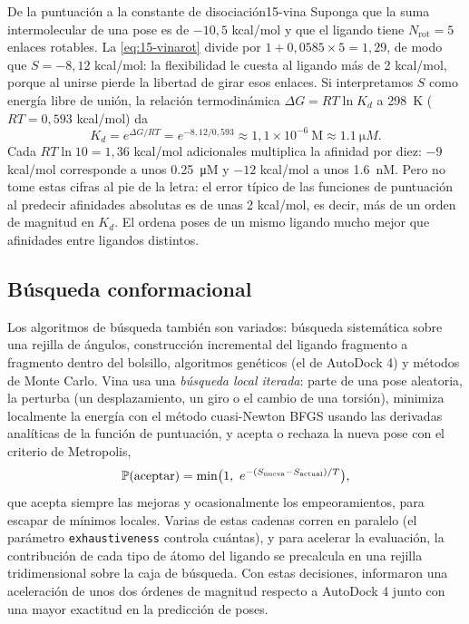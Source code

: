 \begin{ejemplo}{De la puntuación a la constante de disociación}{15-vina}
Suponga que la suma intermolecular de una pose es de $-10{,}5$ kcal/mol y que el ligando tiene $N_{\mathrm{rot}}=5$ enlaces rotables. La \cref{eq:15-vinarot} divide por $1+0{,}0585\times5=1{,}29$, de modo que $S=-8{,}12$ kcal/mol: la flexibilidad le cuesta al ligando más de 2 kcal/mol, porque al unirse pierde la libertad de girar esos enlaces. Si interpretamos $S$ como energía libre de unión, la relación termodinámica $\Delta G=RT\ln K_d$ a \SI{298}{\kelvin} ($RT=0{,}593$ kcal/mol) da
\[
K_d = e^{\Delta G/RT}=e^{-8{,}12/0{,}593}\approx1{,}1\times10^{-6}\ \mathrm{M}\approx\SI{1,1}{\micro M}.
\]
Cada $RT\ln10=1{,}36$ kcal/mol adicionales multiplica la afinidad por diez: $-9$ kcal/mol corresponde a unos \SI{0,25}{\micro M} y $-12$ kcal/mol a unos \SI{1,6}{\nano M}. Pero no tome estas cifras al pie de la letra: el error típico de las funciones de puntuación al predecir afinidades absolutas es de unas 2 kcal/mol, es decir, más de un orden de magnitud en $K_d$. El  ordena poses de un mismo ligando mucho mejor que afinidades entre ligandos distintos.
\end{ejemplo}

\subsection{Búsqueda conformacional}

Los algoritmos de búsqueda también son variados: búsqueda sistemática sobre una rejilla de ángulos, construcción incremental del ligando fragmento a fragmento dentro del bolsillo, algoritmos genéticos (el de AutoDock 4) y métodos de Monte Carlo. Vina usa una \emph{búsqueda local iterada}: parte de una pose aleatoria, la perturba (un desplazamiento, un giro o el cambio de una torsión), minimiza localmente la energía con el método cuasi-Newton BFGS usando las derivadas analíticas de la función de puntuación, y acepta o rechaza la nueva pose con el criterio de Metropolis,
\begin{equation}\label{eq:15-metropolis}
\Prob(\text{aceptar})=\min\!\big(1,\ e^{-(S_{\text{nueva}}-S_{\text{actual}})/T}\big),
\end{equation}
que acepta siempre las mejoras y ocasionalmente los empeoramientos, para escapar de mínimos locales. Varias de estas cadenas corren en paralelo (el parámetro \texttt{exhaustiveness} controla cuántas), y para acelerar la evaluación, la contribución de cada tipo de átomo del ligando se precalcula en una rejilla tridimensional sobre la caja de búsqueda. Con estas decisiones, \textcite{c15-trott2010} informaron una aceleración de unos dos órdenes de magnitud respecto a AutoDock 4 junto con una mayor exactitud en la predicción de poses.

